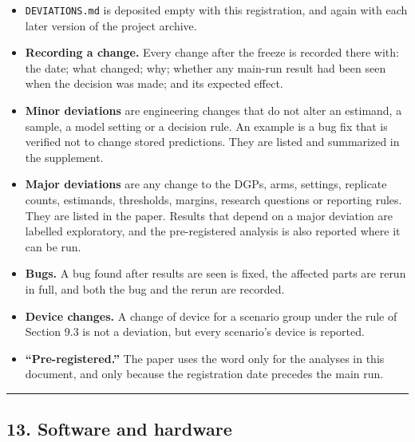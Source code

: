 \documentclass[
  10pt,
]{article}
\providecommand{\tightlist}{%
  \setlength{\itemsep}{0pt}\setlength{\parskip}{0pt}}
\begin{document}
\begin{itemize}
\tightlist
\item
  \texttt{DEVIATIONS.md} is deposited empty with this
  registration, and again with each later version of the
  project archive.
\item
  \textbf{Recording a change.} Every change after the freeze
  is recorded there with: the date; what changed; why;
  whether any main-run result had been seen when the
  decision was made; and its expected effect.
\item
  \textbf{Minor deviations} are engineering changes that do
  not alter an estimand, a sample, a model setting or a
  decision rule. An example is a bug fix that is verified
  not to change stored predictions. They are listed and
  summarized in the supplement.
\item
  \textbf{Major deviations} are any change to the DGPs,
  arms, settings, replicate counts, estimands, thresholds,
  margins, research questions or reporting rules. They are
  listed in the paper. Results that depend on a major
  deviation are labelled exploratory, and the pre-registered
  analysis is also reported where it can be run.
\item
  \textbf{Bugs.} A bug found after results are seen is
  fixed, the affected parts are rerun in full, and both the
  bug and the rerun are recorded.
\item
  \textbf{Device changes.} A change of device for a scenario
  group under the rule of Section 9.3 is not a deviation,
  but every scenario's device is reported.
\item
  \textbf{``Pre-registered.''} The paper uses the word only
  for the analyses in this document, and only because the
  registration date precedes the main run.
\end{itemize}

\begin{center}\rule{0.5\linewidth}{0.5pt}\end{center}

\subsection{13. Software and
hardware}\label{software-and-hardware}
\end{document}
